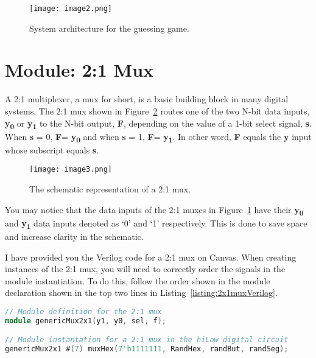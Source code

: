 \begin{figure}[ht]
\texttt{[image: image2.png]}
\caption{System architecture for the guessing game.}
\label{fig:guessGameSysArch}
\end{figure}

\section{Module: 2:1 Mux}

A 2:1 multiplexer, a mux for short, is a basic building block in many
digital systems. The 2:1 mux shown in Figure~\ref{fig:2x1MuxSymbol} routes one of the two
N-bit data inputs, \textbf{y\textsubscript{0}} or
\textbf{y\textsubscript{1}} to the N-bit output, \textbf{F}, depending
on the value of a 1-bit select signal, \textbf{s}. When \textbf{s} = 0,
\textbf{F}= \textbf{y\textsubscript{0}} and when \textbf{s} = 1,
\textbf{F}= \textbf{y\textsubscript{1}}. In other word, \textbf{F}
equals the \textbf{y} input whose subscript equals \textbf{s}.

\begin{figure}[ht]
\texttt{[image: image3.png]}
\caption{The schematic representation of a 2:1 mux.}
\label{fig:2x1MuxSymbol}
\end{figure}

You may notice that the data inputs of the 2:1 muxes in Figure~\ref{fig:guessGameSysArch}
 have
their \textbf{y\textsubscript{0}} and \textbf{y\textsubscript{1}} data
inputs denoted as `0' and `1' respectively. This is done to save space
and increase clarity in the schematic.

I have provided you the Verilog code for a 2:1 mux on Canvas. When
creating instances of the 2:1 mux, you will need to correctly order the
signals in the module instantiation. To do this, follow the
order shown in the module declaration shown in the top two lines in
Listing~\ref{listing:2x1muxVerilog}.

\begin{lstlisting}[language=Verilog,
 caption={Top, module definition for a 2:1 mux.  Bottom, module instantation 
 of a 2:1 mux in Figure~\ref{fig:guessGameSysArch}.},
 label={listing:2x1muxVerilog},
 frame=single]
// Module definition for the 2:1 mux
module genericMux2x1(y1, y0, sel, f);

// Module instantation for a 2:1 mux in the hiLow digital circuit
genericMux2x1 #(7) muxHex(7'b1111111, RandHex, randBut, randSeg);
\end{lstlisting}

